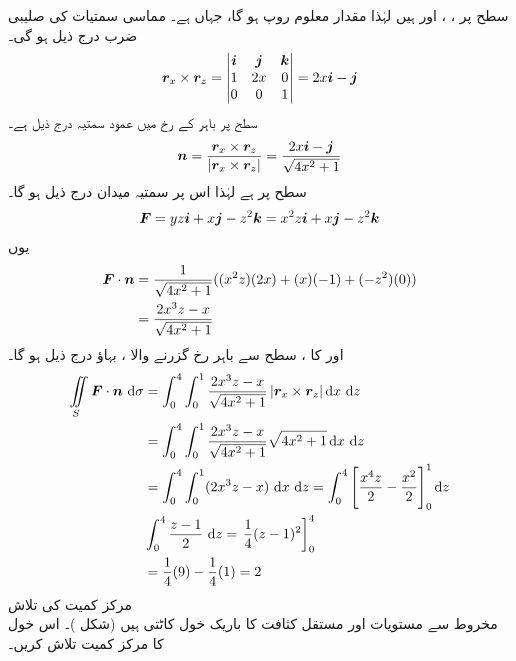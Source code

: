 سطح پر  ، ، اور  ہیں لہٰذا مقدار معلوم روپ  ہو گا،  جہاں ہے۔ مماسی سمتیات کی صلیبی ضرب درج ذیل ہو گی۔
\begin{align*}
{\ensuremath{{\boldsymbol{r}}}}_x \times {\ensuremath{{\boldsymbol{r}}}}_z =
\begin{vmatrix}
{\boldsymbol{i}} & {\boldsymbol{j}} & {\boldsymbol{k}} \\
1 & 2x & 0 \\
0 & 0 & 1
\end{vmatrix}= 2x{\boldsymbol{i}} - {\boldsymbol{j}}
\end{align*}
سطح پر باہر کے  رخ  میں عمود سمتیہ درج ذیل ہے۔
\begin{align*}
{\boldsymbol{n}}=\frac{{{\boldsymbol{r}}}_x\times {\ensuremath{{\boldsymbol{r}}}}_z}{|{{\boldsymbol{r}}}_x\times {\ensuremath{{\boldsymbol{r}}}}_z|}=\frac{2x{\boldsymbol{i}}-{\boldsymbol{j}}}{\sqrt{4x^2+1}}
\end{align*}
سطح پر   ہے لہٰذا اس پر سمتیہ میدان درج ذیل ہو گا۔
\begin{align*}
{\ensuremath{{\boldsymbol{F}}}} = yz{\boldsymbol{i}}+x{\boldsymbol{j}}-z^2{\boldsymbol{k}}=x^2 z{\boldsymbol{i}} + x{\boldsymbol{j}} - z^2{\boldsymbol{k}}
\end{align*}
یوں 
\begin{align*}
{\ensuremath{{\boldsymbol{F}}}} \cdot {\boldsymbol{n}}&=\frac{1}{\sqrt{4x^2+1}}((x^2z)(2x)+(x)(-1)+(-z^2)(0))\\
&=\frac{2x^3 z - x}{\sqrt{4x^2 + 1}}
\end{align*}
اور  کا  ، سطح  سے  باہر رخ گزرنے والا ، بہاؤ درج ذیل ہو گا۔
\begin{align*}
\iint\limits_S \kvec{F} \cdot \an\, \dif \sigma &=\int_0^4 \int_0^1\frac{2x^3 z - x}{\sqrt{4x^2 + 1}}
\left| \kvec{r}_x \times \kvec{r}_z \right| \dif x\, \dif z\\
&=\int_0^4 \int_0^1\frac{2x^3 z - x}{\sqrt{4x^2 + 1}}\sqrt{4x^2+1}\dif x\, \dif z\\
&=\int_0^4 \int_0^1 (2x^3 z - x)\, \dif x\, \dif z=\int_0^4\left[ \frac{x^4 z}{2} - \frac{x^2}{2} \right]_0^1 \dif z\\
&\int_0^4 \frac{z - 1}{2}\, \dif z=\left.\frac{1}{4} (z - 1)^2\right]_0^4\\
&=\frac{1}{4}(9)-\frac{1}{4}(1)=2
\end{align*}
مرکز کمیت کی تلاش\\
  مخروط  سے مستویات   اور  مستقل کثافت      کا باریک خول   کاٹتی ہیں  (شکل )۔ اس خول کا مرکز کمیت تلاش کریں۔ 
